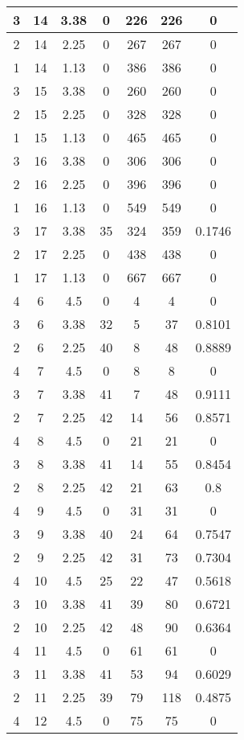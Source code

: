 \documentclass[letterpaper, 12pt]{article}
\begin{document}
\begin{longtable}{|c|c|c|c|c|c|c|}
\hline
3 & 14 & 3.38 & 0 & 226 & 226 & 0 \\
\hline
2 & 14 & 2.25 & 0 & 267 & 267 & 0 \\
\hline
1 & 14 & 1.13 & 0 & 386 & 386 & 0 \\
\hline
3 & 15 & 3.38 & 0 & 260 & 260 & 0 \\
\hline
2 & 15 & 2.25 & 0 & 328 & 328 & 0 \\
\hline
1 & 15 & 1.13 & 0 & 465 & 465 & 0 \\
\hline
3 & 16 & 3.38 & 0 & 306 & 306 & 0 \\
\hline
2 & 16 & 2.25 & 0 & 396 & 396 & 0 \\
\hline
1 & 16 & 1.13 & 0 & 549 & 549 & 0 \\
\hline
3 & 17 & 3.38 & 35 & 324 & 359 & 0.1746 \\
\hline
2 & 17 & 2.25 & 0 & 438 & 438 & 0 \\
\hline
1 & 17 & 1.13 & 0 & 667 & 667 & 0 \\
\hline
4 & 6 & 4.5 & 0 & 4 & 4 & 0 \\
\hline
3 & 6 & 3.38 & 32 & 5 & 37 & 0.8101 \\
\hline
2 & 6 & 2.25 & 40 & 8 & 48 & 0.8889 \\
\hline
4 & 7 & 4.5 & 0 & 8 & 8 & 0 \\
\hline
3 & 7 & 3.38 & 41 & 7 & 48 & 0.9111 \\
\hline
2 & 7 & 2.25 & 42 & 14 & 56 & 0.8571 \\
\hline
4 & 8 & 4.5 & 0 & 21 & 21 & 0 \\
\hline
3 & 8 & 3.38 & 41 & 14 & 55 & 0.8454 \\
\hline
2 & 8 & 2.25 & 42 & 21 & 63 & 0.8 \\
\hline
4 & 9 & 4.5 & 0 & 31 & 31 & 0 \\
\hline
3 & 9 & 3.38 & 40 & 24 & 64 & 0.7547 \\
\hline
2 & 9 & 2.25 & 42 & 31 & 73 & 0.7304 \\
\hline
4 & 10 & 4.5 & 25 & 22 & 47 & 0.5618 \\
\hline
3 & 10 & 3.38 & 41 & 39 & 80 & 0.6721 \\
\hline
2 & 10 & 2.25 & 42 & 48 & 90 & 0.6364 \\
\hline
4 & 11 & 4.5 & 0 & 61 & 61 & 0 \\
\hline
3 & 11 & 3.38 & 41 & 53 & 94 & 0.6029 \\
\hline
2 & 11 & 2.25 & 39 & 79 & 118 & 0.4875 \\
\hline
4 & 12 & 4.5 & 0 & 75 & 75 & 0 \\

\end{longtable}
\end{document}
